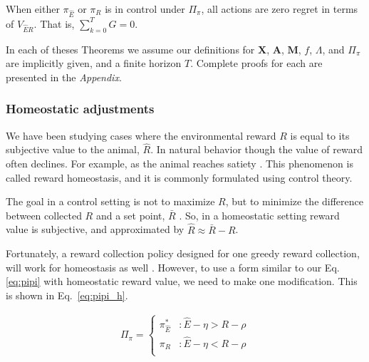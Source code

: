 \begin{theorem}
	\label{th:no_regret_ER}
	When either $\pi_{\hat E}$ or $\pi_R$ is in control under $\Pi_{\pi}$, all actions are zero regret in terms of $V_{\hat{E}R}$. That is, $\sum_{k=0}^{T} G = 0$.
\end{theorem}

In each of theses Theorems we assume our definitions for $\mathbf{X}$, $\mathbf{A}$, $\mathbf{M}$, $f$, $\Lambda$, and $\Pi_{\pi}$ are implicitly given, and a finite horizon $T$. Complete proofs for each are presented in the \emph{Appendix}. 

\subsubsection*{Homeostatic adjustments}
We have been studying cases where the environmental reward $R$ is equal to its subjective value to the animal, $\hat R$. In natural behavior though the value of reward often declines. For example, as the animal reaches satiety \cite{Keramati2014,Juechems2019,Munch2020}. This phenomenon is called reward homeostasis, and it is commonly formulated using control theory.

The goal in a control setting is not to maximize $R$, but to minimize the difference between collected $R$ and a set point, $\bar R$ \cite{Keramati2014,Juechems2019,Munch2020}. So, in a homeostatic setting reward value is subjective, and approximated by $\hat R \approx \bar R - R$.

Fortunately, a reward collection policy designed for one greedy reward collection, will work for homeostasis as well \cite{Keramati2014}. However, to use a form similar to our Eq. \ref{eq:pipi} with homeostatic reward value, we need to make one modification. This is shown in Eq.~\ref{eq:pipi_h}. 

\begin{equation} 
    \label{eq:pipi_h}
    \begin{split}
        \Pi_{\pi} = 
        \begin{cases}
            \pi^*_{\hat{E}} & : \hat{E} - \eta > R - \rho \\
            \pi_R 	& : \hat{E} - \eta < R - \rho \\
        \end{cases}
    \end{split}
\end{equation}

